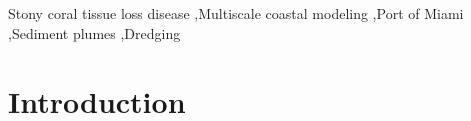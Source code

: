 \documentclass[preprint,12pt,authoryear]{elsarticle}
\begin{document}
\begin{frontmatter}
    \begin{keyword}
        Stony coral tissue loss disease \sep Multiscale coastal modeling \sep Port of Miami \sep Sediment plumes \sep Dredging



    \end{keyword}

\end{frontmatter}

\linenumbers

\section{Introduction}
\end{document}
